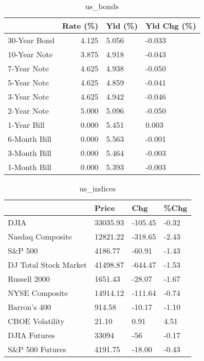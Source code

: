 \documentclass{article}%
\begin{document}
%


\begin{table}[htbp]%
\caption{us\_bonds}%
\centering%
\begin{adjustbox}{width=1\textwidth}%
\begin{tabular}{lrll}
\toprule
             &  Rate (\%) & Yld (\%) & Yld Chg (\%) \\
\midrule
30-Year Bond &     4.125 &   5.056 &      -0.033 \\
10-Year Note &     3.875 &   4.918 &      -0.043 \\
 7-Year Note &     4.625 &   4.938 &      -0.050 \\
 5-Year Note &     4.625 &   4.859 &      -0.041 \\
 3-Year Note &     4.625 &   4.942 &      -0.046 \\
 2-Year Note &     5.000 &   5.096 &      -0.050 \\
 1-Year Bill &     0.000 &   5.451 &       0.003 \\
6-Month Bill &     0.000 &   5.563 &      -0.001 \\
3-Month Bill &     0.000 &   5.464 &      -0.003 \\
1-Month Bill &     0.000 &   5.393 &      -0.003 \\
\bottomrule
\end{tabular}
%
\end{adjustbox}%
\end{table}

%


\begin{table}[htbp]%
\caption{us\_indices}%
\centering%
\begin{adjustbox}{width=1\textwidth}%
\begin{tabular}{llll}
\toprule
                      &    Price &     Chg &  \%Chg \\
\midrule
                 DJIA & 33035.93 & -105.45 & -0.32 \\
     Nasdaq Composite & 12821.22 & -318.65 & -2.43 \\
              S\&P 500 &  4186.77 &  -60.91 & -1.43 \\
DJ Total Stock Market & 41498.87 & -644.47 & -1.53 \\
         Russell 2000 &  1651.43 &  -28.07 & -1.67 \\
       NYSE Composite & 14914.12 & -111.64 & -0.74 \\
         Barron's 400 &   914.58 &  -10.17 & -1.10 \\
      CBOE Volatility &    21.10 &    0.91 &  4.51 \\
         DJIA Futures &    33094 &     -56 & -0.17 \\
      S\&P 500 Futures &  4191.75 &  -18.00 & -0.43 \\
\bottomrule
\end{tabular}
%
\end{adjustbox}%
\end{table}
\end{document}
